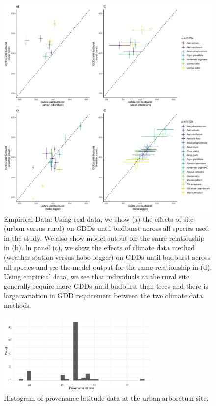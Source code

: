 \documentclass{article}\usepackage[]{graphicx}\usepackage[]{color}
\begin{document}
\begin{figure}[H]
    \centering
    \includegraphics[width=12cm]{..//analyses/figures/speciesdiffs.pdf}
\caption{ Empirical Data: Using real data, we show (a) the effects of site (urban versus rural) on GDDs until budburst across all species used in the study. We also show model output for the same relationship in (b). In panel (c), we show the effects of climate data method (weather station versus hobo logger) on GDDs until budburst across all species and see the model output for the same relationship in (d). Using empirical data, we see that individuals at the rural site generally require more GDDs until budburst than trees and there is large variation in GDD requirement between the two climate data methods.}
\label{fig:sppsdiffs}
\end{figure}

\begin{figure}[H]
      \centering
      \includegraphics[width=8cm]{..//analyses/figures/prov_hist.pdf}
\caption{ Histogram of provenance latitude data at the urban arboretum site.}
\label{fig:provhist}
\end{figure}


  
\end{document}
